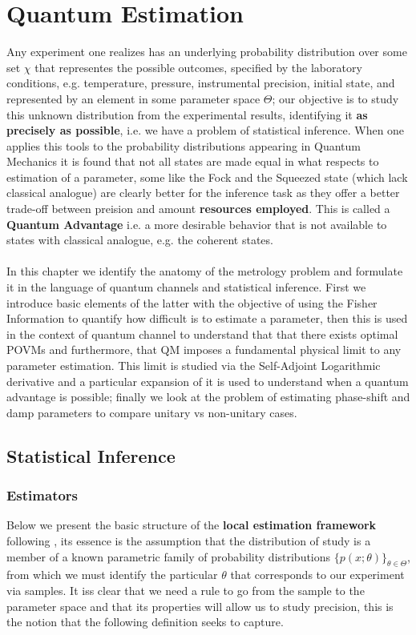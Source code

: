 \chapter{Quantum Estimation}
Any experiment one realizes has an underlying probability distribution over some set $\chi$ that representes the
possible outcomes, specified by the laboratory conditions, e.g. temperature, pressure, instrumental precision, initial state, and
represented by an element in some parameter space $\Theta$; our objective
is to study this unknown distribution from the experimental results, identifying it \textbf{as precisely as possible}, i.e. we have a problem of
statistical inference. When one applies this tools to the probability distributions appearing in Quantum Mechanics it is found that not all
states are made equal in what respects to estimation of a parameter, some like the Fock and the Squeezed state (which lack classical analogue)
are clearly better for the inference task as they offer a better trade-off between preision and amount \textbf{resources employed}. This is
called a \textbf{Quantum Advantage} i.e. a more desirable behavior that is not available to states with classical analogue, e.g. the coherent states.
\\\\
In this chapter we identify the anatomy of the metrology problem and formulate it in the language of quantum channels and statistical inference. First we introduce basic elements of the latter with the objective of using the Fisher Information to quantify how difficult is to estimate a parameter, then this is used in the context of quantum channel to understand that that there exists optimal POVMs and furthermore,
that QM imposes a fundamental physical limit to any parameter estimation. This limit is studied via the Self-Adjoint Logarithmic derivative
and a particular expansion of it is used to understand when a quantum advantage is possible; finally we look at the problem of estimating
phase-shift and damp parameters to compare unitary vs non-unitary cases.

\section{Statistical Inference}
\subsection{Estimators}
 Below we present the basic structure of the \textbf{local estimation framework} following \cite{cover_elements_2006,paris_quantum_2009}, its essence is the assumption that the
distribution of study is a member of a known parametric family of probability distributions $\{p(x;\theta)\}_{\theta \in \Theta}$, from which we
must identify the particular $\theta$ that corresponds to our experiment via samples. It iss clear that we need a rule
to go from the sample to the parameter space and that its properties will allow us to study precision, this is the notion that the following
definition seeks to capture.

